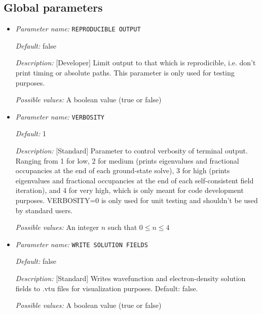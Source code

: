 \subsection{Global parameters}
\label{parameters:global}


\begin{itemize}
\item {\it Parameter name:} {\tt REPRODUCIBLE OUTPUT}
\label{parameters:REPRODUCIBLE OUTPUT}
\label{parameters:REPRODUCIBLE_20OUTPUT}




{\it Default:} false


{\it Description:} [Developer] Limit output to that which is reprodicible, i.e. don't print timing or absolute paths. This parameter is only used for testing purposes.


{\it Possible values:} A boolean value (true or false)
\item {\it Parameter name:} {\tt VERBOSITY}
\label{parameters:VERBOSITY}




{\it Default:} 1


{\it Description:} [Standard] Parameter to control verbosity of terminal output. Ranging from 1 for low, 2 for medium (prints eigenvalues and fractional occupancies at the end of each ground-state solve), 3 for high (prints eigenvalues and fractional occupancies at the end of each self-consistent field iteration), and 4 for very high, which is only meant for code development purposes. VERBOSITY=0 is only used for unit testing and shouldn't be used by standard users.


{\it Possible values:} An integer $n$ such that $0\leq n \leq 4$
\item {\it Parameter name:} {\tt WRITE SOLUTION FIELDS}
\label{parameters:WRITE SOLUTION FIELDS}
\label{parameters:WRITE_20SOLUTION_20FIELDS}




{\it Default:} false


{\it Description:} [Standard] Writes wavefunction and electron-density solution fields to .vtu files for visualization purposes. Default: false.


{\it Possible values:} A boolean value (true or false)
\end{itemize}



